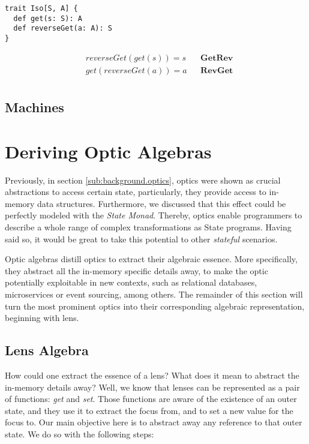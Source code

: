\documentclass[a4paper]{article}
\begin{document}
\begin{lstlisting}
trait Iso[S, A] {
  def get(s: S): A
  def reverseGet(a: A): S
}
\end{lstlisting}

\begin{align*}
  & reverseGet(get(s)) = s &&\textbf{GetRev} \\
  & get(reverseGet(a)) = a &&\textbf{RevGet} \\
\end{align*}


\subsection{Machines}

\section{Deriving Optic Algebras}

Previously, in section \ref{sub:background.optics}, optics were shown as crucial
abstractions to access certain state, particularly, they provide access to
in-memory data structures. Furthermore, we discussed that this effect could be
perfectly modeled with the \emph{State Monad}. Thereby, optics enable
programmers to describe a whole range of complex transformations as State
programs. Having said so, it would be great to take this potential to other
\emph{stateful} scenarios.

Optic algebras distill optics to extract their algebraic essence. More
specifically, they abstract all the in-memory specific details away, to make the
optic potentially exploitable in new contexts, such as relational databases,
microservices or event sourcing, among others. The remainder of this section
will turn the most prominent optics into their corresponding algebraic
representation, beginning with lens.

\subsection{Lens Algebra}

How could one extract the essence of a lens? What does it mean to abstract the
in-memory details away? Well, we know that lenses can be represented as a pair
of functions: \emph{get} and \emph{set}. Those functions are aware of the
existence of an outer state, and they use it to extract the focus from, and to
set a new value for the focus to. Our main objective here is to abstract away
any reference to that outer state. We do so with the following steps:
\end{document}
